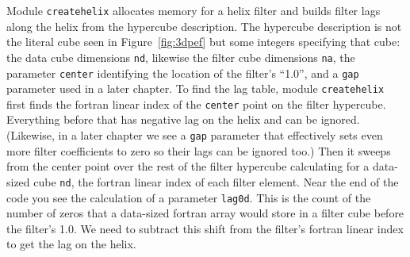 %      

\par
Module
\texttt{createhelix} 
allocates memory for a helix filter and builds
filter lags along the helix from the hypercube description.
The hypercube description is not the literal cube
seen in Figure~\ref{fig:3dpef} but
some integers specifying that cube:
the data cube dimensions            \texttt{nd},
likewise the filter cube dimensions \texttt{na},
the parameter \texttt{center} identifying
the location of the filter's ``1.0'',
and a \texttt{gap} parameter used in a later chapter.
To find the lag table,
module \texttt{createhelix} %
first finds the
fortran linear index of the \texttt{center} point on the filter hypercube.
Everything before that has negative lag on the helix and can be ignored.
(Likewise, in a later chapter we see a \texttt{gap} parameter
that effectively sets even more filter coefficients to zero
so their lags can be ignored too.)
Then it sweeps from the center point over the rest of the filter hypercube
calculating for a data-sized cube \texttt{nd},
the fortran linear index of each filter element.
Near
the end of the code you see the calculation of a parameter \texttt{lag0d}.
This is the count of the number of zeros that
a data-sized fortran array would store
in a filter cube before the filter's 1.0.
We need to subtract this shift
from the filter's fortran linear index to get the lag on the helix.

